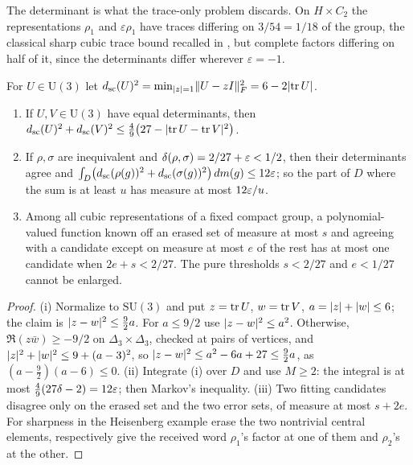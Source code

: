 The determinant is what the trace-only problem discards. On $H\times C_2$ the representations $\rho_1$ and
$\varepsilon\rho_1$ have traces differing on $3/54=1/18$ of the group, the classical sharp cubic trace bound recalled
in \cite{MartinWalji2017Distinguishing}, but complete factors differing on half of it, since the determinants
differ wherever $\varepsilon=-1$.

\begin{theorem}\label{eul:thm:stability}
For $U\in\mathrm U(3)$ let $d_{\mathrm{sc}}(U)^2=\min_{\lvert z\rvert=1}\lVert U-zI\rVert_F^2=6-2\lvert\operatorname{tr} U\rvert$.
\begin{enumerate}[label=\textup{(\roman*)}]
\item If $U,V\in\mathrm U(3)$ have equal determinants, then
$d_{\mathrm{sc}}(U)^2+d_{\mathrm{sc}}(V)^2\le\frac49\bigl(27-\lvert\operatorname{tr} U-\operatorname{tr} V\rvert^2\bigr)$.
\item If $\rho,\sigma$ are inequivalent and $\delta(\rho,\sigma)=2/27+\varepsilon<1/2$, then their determinants agree and
$\int_D\bigl(d_{\mathrm{sc}}(\rho(g))^2+d_{\mathrm{sc}}(\sigma(g))^2\bigr)\,dm(g)\le12\varepsilon$; so the part of $D$ where the
sum is at least $u$ has measure at most $12\varepsilon/u$.
\item Among all cubic representations of a fixed compact group, a polynomial-valued function known off an erased set
of measure at most $s$ and agreeing with a candidate except on measure at most $e$ of the rest has at most one
candidate when $2e+s<2/27$. The pure thresholds $s<2/27$ and $e<1/27$ cannot be enlarged.
\end{enumerate}
\end{theorem}

\begin{proof}
(i) Normalize to $\mathrm{SU}(3)$ and put $z=\operatorname{tr} U$, $w=\operatorname{tr} V$, $a=\lvert z\rvert+\lvert w\rvert\le6$; the claim is
$\lvert z-w\rvert^2\le\frac92a$. For $a\le9/2$ use $\lvert z-w\rvert^2\le a^2$. Otherwise, $\Re(z\bar w)\ge-9/2$ on
$\Delta_3\times\Delta_3$, checked at pairs of vertices, and $\lvert z\rvert^2+\lvert w\rvert^2\le9+(a-3)^2$, so
$\lvert z-w\rvert^2\le a^2-6a+27\le\frac92a$, as $(a-\frac92)(a-6)\le0$. (ii) Integrate (i) over $D$ and use
$M\ge2$: the integral is at most $\frac49(27\delta-2)=12\varepsilon$; then Markov's inequality. (iii) Two fitting
candidates disagree only on the erased set and the two error sets, of measure at most $s+2e$. For sharpness in the
Heisenberg example erase the two nontrivial central elements, respectively give the received word $\rho_1$'s factor
at one of them and $\rho_2$'s at the other.
\end{proof}

